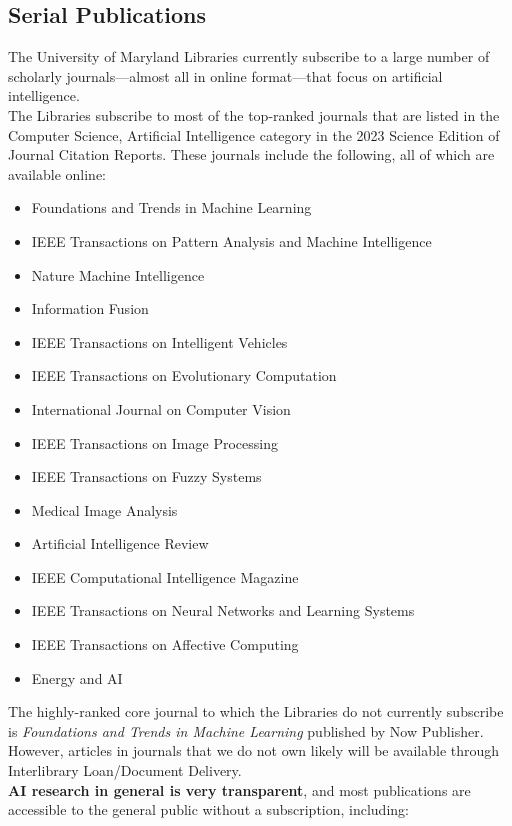 \subsection*{Serial Publications}
The University of Maryland Libraries currently subscribe to a large number of scholarly journals—almost all in online format—that focus on artificial intelligence.\\
The Libraries subscribe to most of the top-ranked journals that are listed in the Computer Science, Artificial Intelligence category in the 2023 Science Edition of Journal Citation Reports. These journals include the following, all of which are available online:

\begin{itemize}
    \item Foundations and Trends in Machine Learning
    \item IEEE Transactions on Pattern Analysis and Machine Intelligence
    \item Nature Machine Intelligence
    \item Information Fusion
    \item IEEE Transactions on Intelligent Vehicles
    \item IEEE Transactions on Evolutionary Computation
    \item International Journal on Computer Vision
    \item IEEE Transactions on Image Processing
    \item IEEE Transactions on Fuzzy Systems
    \item Medical Image Analysis
    \item Artificial Intelligence Review
    \item IEEE Computational Intelligence Magazine
    \item IEEE Transactions on Neural Networks and Learning Systems
    \item IEEE Transactions on Affective Computing
    \item Energy and AI
\end{itemize}

The highly-ranked core journal to which the Libraries do not currently subscribe is \textit{Foundations and Trends in Machine Learning} published by Now Publisher. However, articles in journals that we do not own likely will be available through Interlibrary Loan/Document Delivery.\\
\textbf{AI research in general is very transparent}, and most publications are accessible to the general public without a subscription, including:

